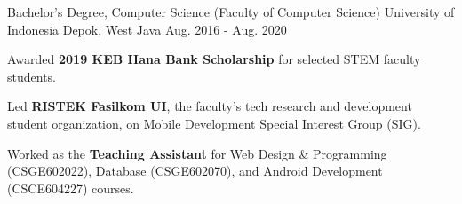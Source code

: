 

\begin{cventries}

  \cventry
    {Bachelor's Degree, Computer Science (Faculty of Computer Science)} %
    {University of Indonesia} %
    {Depok, West Java} %
    {Aug. 2016 - Aug. 2020} %
    {
      \begin{cvitems} %
        \item {Awarded \textbf{2019 KEB Hana Bank Scholarship} for selected STEM faculty students.}
        \item {Led \textbf{RISTEK Fasilkom UI}, the faculty's tech research and development student organization, on Mobile Development Special Interest Group (SIG).}
        \item {Worked as the \textbf{Teaching Assistant} for Web Design \& Programming (CSGE602022), Database (CSGE602070), and Android Development (CSCE604227) courses.}
      \end{cvitems}
    }

\end{cventries}
